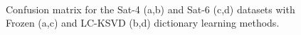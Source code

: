 \begin{figure}[!t]%
    \centering
    \qquad
    \\\label{fig: sat4_rslt}%
    
    
    \qquad
    \caption[]{Confusion matrix for the Sat-4 (a,b) and Sat-6 (c,d) datasets with Frozen (a,c) and LC-KSVD (b,d) dictionary learning methods.}%
    \label{fig: sat6_rslt}%
    \end{figure}
    
